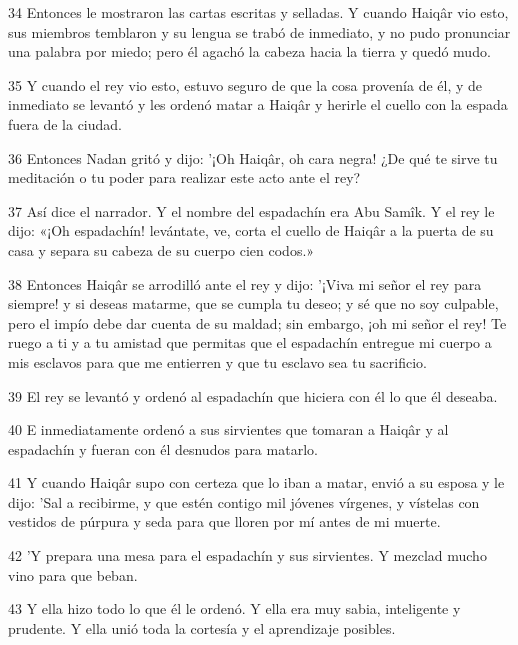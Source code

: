 \par 34 Entonces le mostraron las cartas escritas y selladas. Y cuando Haiqâr vio esto, sus miembros temblaron y su lengua se trabó de inmediato, y no pudo pronunciar una palabra por miedo; pero él agachó la cabeza hacia la tierra y quedó mudo.

\par 35 Y cuando el rey vio esto, estuvo seguro de que la cosa provenía de él, y de inmediato se levantó y les ordenó matar a Haiqâr y herirle el cuello con la espada fuera de la ciudad.

\par 36 Entonces Nadan gritó y dijo: '¡Oh Haiqâr, oh cara negra! ¿De qué te sirve tu meditación o tu poder para realizar este acto ante el rey?

\par 37 Así dice el narrador. Y el nombre del espadachín era Abu Samîk. Y el rey le dijo: «¡Oh espadachín! levántate, ve, corta el cuello de Haiqâr a la puerta de su casa y separa su cabeza de su cuerpo cien codos.»

\par 38 Entonces Haiqâr se arrodilló ante el rey y dijo: '¡Viva mi señor el rey para siempre! y si deseas matarme, que se cumpla tu deseo; y sé que no soy culpable, pero el impío debe dar cuenta de su maldad; sin embargo, ¡oh mi señor el rey! Te ruego a ti y a tu amistad que permitas que el espadachín entregue mi cuerpo a mis esclavos para que me entierren y que tu esclavo sea tu sacrificio.

\par 39 El rey se levantó y ordenó al espadachín que hiciera con él lo que él deseaba.

\par 40 E inmediatamente ordenó a sus sirvientes que tomaran a Haiqâr y al espadachín y fueran con él desnudos para matarlo.

\par 41 Y cuando Haiqâr supo con certeza que lo iban a matar, envió a su esposa y le dijo: 'Sal a recibirme, y que estén contigo mil jóvenes vírgenes, y vístelas con vestidos de púrpura y seda para que lloren por mí antes de mi muerte.

\par 42 'Y prepara una mesa para el espadachín y sus sirvientes. Y mezclad mucho vino para que beban.

\par 43 Y ella hizo todo lo que él le ordenó. Y ella era muy sabia, inteligente y prudente. Y ella unió toda la cortesía y el aprendizaje posibles.

